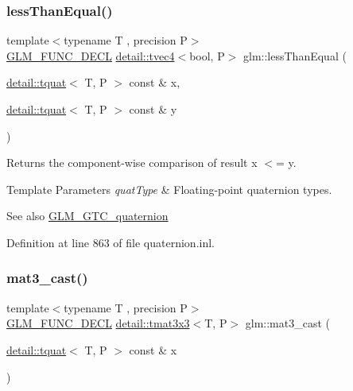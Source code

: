 \subsubsection{\texorpdfstring{less\+Than\+Equal()}{lessThanEqual()}}
{\footnotesize\ttfamily template$<$typename T , precision P$>$ \\
\hyperlink{setup_8hpp_ab2d052de21a70539923e9bcbf6e83a51}{G\+L\+M\+\_\+\+F\+U\+N\+C\+\_\+\+D\+E\+CL} \hyperlink{structglm_1_1detail_1_1tvec4}{detail\+::tvec4}$<$bool, P$>$ glm\+::less\+Than\+Equal (\begin{DoxyParamCaption}\item[{\hyperlink{structglm_1_1detail_1_1tquat}{detail\+::tquat}$<$ T, P $>$ const \&}]{x,  }\item[{\hyperlink{structglm_1_1detail_1_1tquat}{detail\+::tquat}$<$ T, P $>$ const \&}]{y }\end{DoxyParamCaption})}

Returns the component-\/wise comparison of result x $<$= y.


\begin{DoxyTemplParams}{Template Parameters}
{\em quat\+Type} & Floating-\/point quaternion types.\\
\hline
\end{DoxyTemplParams}
\begin{DoxySeeAlso}{See also}
\hyperlink{group__gtc__quaternion}{G\+L\+M\+\_\+\+G\+T\+C\+\_\+quaternion} 
\end{DoxySeeAlso}


Definition at line 863 of file quaternion.\+inl.

\mbox{\label{group__gtc__quaternion_ga65257c3494022ad80a50ce11da95049d}} 
\subsubsection{\texorpdfstring{mat3\+\_\+cast()}{mat3\_cast()}}
{\footnotesize\ttfamily template$<$typename T , precision P$>$ \\
\hyperlink{setup_8hpp_ab2d052de21a70539923e9bcbf6e83a51}{G\+L\+M\+\_\+\+F\+U\+N\+C\+\_\+\+D\+E\+CL} \hyperlink{structglm_1_1detail_1_1tmat3x3}{detail\+::tmat3x3}$<$T, P$>$ glm\+::mat3\+\_\+cast (\begin{DoxyParamCaption}\item[{\hyperlink{structglm_1_1detail_1_1tquat}{detail\+::tquat}$<$ T, P $>$ const \&}]{x }\end{DoxyParamCaption})}

